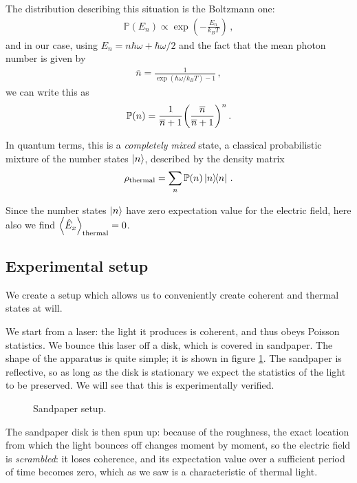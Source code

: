 \documentclass[main.tex]{subfiles}
\begin{document}
The distribution describing this situation is the Boltzmann one: 
%
\begin{align}
\mathbb{P} (E_n) \propto \exp( - \frac{E_n}{k_B T})
\,,
\end{align}
%
and in our case, using \(E_n = n \hbar \omega + \hbar \omega /2\) and the fact that the mean photon number is given by 
%
\begin{align}
\overline{n} = \frac{1}{\exp( \hbar \omega  / k_B T) - 1}
\,,
\end{align}
%
we can write this as 
%
\begin{align}
\mathbb{P}(n) = \frac{1}{\overline{n} +1} \qty(\frac{\overline{n}}{\overline{n}+1})^{n}
\,.
\end{align}

In quantum terms, this is a \emph{completely mixed} state, a classical probabilistic mixture of the number states \(\ket{n}\), described by the density matrix 
%
\begin{align}
\rho _{\text{thermal}} = \sum _{n} \mathbb{P}(n) \dyad{n} 
\,.
\end{align}

Since the number states \(\ket{n}\) have zero expectation value for the electric field, here also we find \(\expval{\hat{E}_x}_{\text{thermal}} = 0\). 

\subsection{Experimental setup}

We create a setup which allows us to conveniently create coherent and thermal states at will.

We start from a laser: the light it produces is coherent, and thus obeys Poisson statistics. 
We bounce this laser off a disk, which is covered in sandpaper. The shape of the apparatus is quite simple; it is shown in figure \ref{fig:sandpaper}.  
The sandpaper is reflective, so as long as the disk is stationary we expect the statistics of the light to be preserved. We will see that this is experimentally verified. 

\begin{figure}[ht]
\centering

\caption{Sandpaper setup.}
\label{fig:sandpaper}
\end{figure}

The sandpaper disk is then spun up: because of the roughness, the exact location from which the light bounces off changes moment by moment, so the electric field is \emph{scrambled}: it loses coherence, and its expectation value over a sufficient period of time becomes zero, which as we saw is a characteristic of thermal light.
\end{document}
